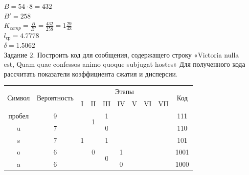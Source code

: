 \documentclass[a4paper,14pt]{extarticle}
\begin{document}
$B = 54 \cdot 8 = 432$\\
$B' = 258 $\\
$K_{comp} = \frac{B}{B'} = \frac{432}{258} = 1\frac{29}{43}$\\
$l_{ср} = 4.7778$\\
$\delta = 1.5062$\\

Задание 2. Построить код для сообщения, содержащего строку «Victoria nulla est, Quam quae confessos animo quoque subjugat hostes»
Для полученного кода рассчитать показатели коэффициента сжатия и
дисперсии.\\
\begin{center}
    \begin{tabular}{|c|c|c|c|c|c|c|c|c|c|}
        \hline
        \multirow{2}{*}{Символ} & \multirow{2}{*}{Вероятность} & \multicolumn{7}{|c|}{Этапы} & \multirow{2}{*}{Код}                                                                                                     \\
        \cline{3-9}
                                &                              & I                           & II                   & III                & IV                 & V                  & VI                 & VII &         \\
        \hline
        пробел                  & 9                            & \multirow{5}{*}{1}          & \multirow{2}{*}{1}   & 1                  &                    &                    &                    &     & 111     \\
        \cline{1-2} \cline{5-10}
        u                       & 7                            &                             &                      & 0                  &                    &                    &                    &     & 110     \\
        \cline{1-2} \cline{4-10}
        s                       & 7                            &                             & \multirow{3}{*}{0}   & 1                  &                    &                    &                    &     & 101     \\
        \cline{1-2} \cline{5-10}
        o                       & 6                            &                             &                      & \multirow{2}{*}{0} & 1                  &                    &                    &     & 1001    \\
        \cline{1-2} \cline{6-10}
        a                       & 6                            &                             &                      &                    & 0                  &                    &                    &     & 1000    \\

\end{tabular}
\end{center}
\end{document}

